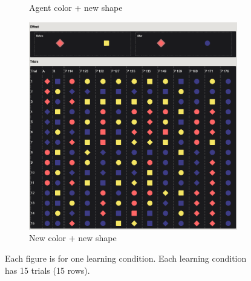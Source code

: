 \documentclass{article}
\begin{document}
\begin{figure}[h!]
\begin{subfigure}[t]{0.32\textwidth}
    \caption{Agent color + new shape} \label{fig:learn06}
  \end{subfigure}
  \begin{subfigure}[t]{0.32\textwidth}
    \centering
    \includegraphics[width=\linewidth]{rev_07} 
    \caption{New color + new shape} \label{fig:learn07}
  \end{subfigure}
  \caption{Each figure is for one learning condition. 
  Each learning condition has 15 trials (15 rows).}
\end{figure}
\end{document}

